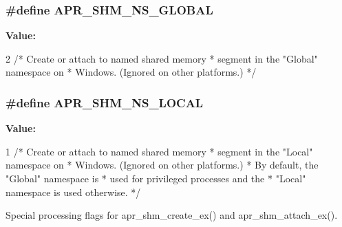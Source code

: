 \subsubsection[{\texorpdfstring{A\+P\+R\+\_\+\+S\+H\+M\+\_\+\+N\+S\+\_\+\+G\+L\+O\+B\+AL}{APR_SHM_NS_GLOBAL}}]{\setlength{\rightskip}{0pt plus 5cm}\#define A\+P\+R\+\_\+\+S\+H\+M\+\_\+\+N\+S\+\_\+\+G\+L\+O\+B\+AL}\hypertarget{group__apr__shm_ga0de8e4acab42e7ff8e35e5ac9620f667}{}\label{group__apr__shm_ga0de8e4acab42e7ff8e35e5ac9620f667}
{\bfseries Value\+:}
\begin{DoxyCode}
2 \textcolor{comment}{/* Create or attach to named shared memory}
\textcolor{comment}{                               * segment in the "Global" namespace on}
\textcolor{comment}{                               * Windows.  (Ignored on other platforms.)}
\textcolor{comment}{                               */}
\end{DoxyCode}
\subsubsection[{\texorpdfstring{A\+P\+R\+\_\+\+S\+H\+M\+\_\+\+N\+S\+\_\+\+L\+O\+C\+AL}{APR_SHM_NS_LOCAL}}]{\setlength{\rightskip}{0pt plus 5cm}\#define A\+P\+R\+\_\+\+S\+H\+M\+\_\+\+N\+S\+\_\+\+L\+O\+C\+AL}\hypertarget{group__apr__shm_ga47cc28ddc5f32cf904383b9e4f82825b}{}\label{group__apr__shm_ga47cc28ddc5f32cf904383b9e4f82825b}
{\bfseries Value\+:}
\begin{DoxyCode}
1 \textcolor{comment}{/* Create or attach to named shared memory}
\textcolor{comment}{                               * segment in the "Local" namespace on}
\textcolor{comment}{                               * Windows.  (Ignored on other platforms.)}
\textcolor{comment}{                               * By default, the "Global" namespace is}
\textcolor{comment}{                               * used for privileged processes and the}
\textcolor{comment}{                               * "Local" namespace is used otherwise.}
\textcolor{comment}{                               */}
\end{DoxyCode}
Special processing flags for apr\+\_\+shm\+\_\+create\+\_\+ex() and apr\+\_\+shm\+\_\+attach\+\_\+ex(). 

